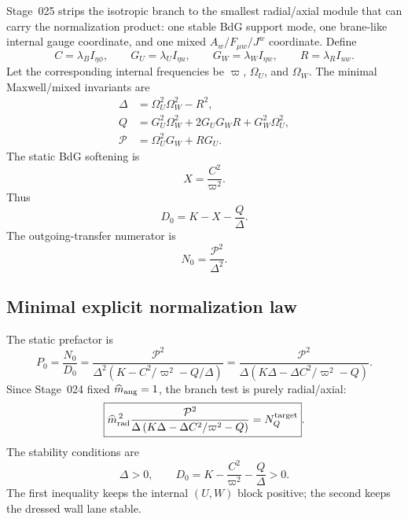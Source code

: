 Stage~025 strips the isotropic branch to the smallest radial/axial module that can carry the normalization product: one stable BdG support mode, one brane-like internal gauge coordinate, and one mixed \(A_w/F_{\mu w}/J^w\) coordinate.  Define
\begin{equation}
\label{eq:part02-stage8-couplings}
C=\lambda_B I_{\eta\phi},
\qquad
G_U=\lambda_U I_{\eta u},
\qquad
G_W=\lambda_W I_{\eta w},
\qquad
R=\lambda_R I_{uw}.
\end{equation}
Let the corresponding internal frequencies be \(\varpi\), \(\Omega_U\), and \(\Omega_W\).  The minimal Maxwell/mixed invariants are
\begin{equation}
\label{eq:part02-stage8-invariants}
\boxed{
\begin{aligned}
\Delta&=\Omega_U^2\Omega_W^2-R^2,\\
Q&=G_U^2\Omega_W^2+2G_UG_WR+G_W^2\Omega_U^2,\\
\mathcal P&=\Omega_U^2G_W+RG_U.
\end{aligned}
}
\end{equation}
The static BdG softening is
\begin{equation}
X=\frac{C^2}{\varpi^2}.
\end{equation}
Thus
\begin{equation}
\label{eq:part02-stage8-D0}
D_0=K-X-\frac{Q}{\Delta}.
\end{equation}
The outgoing-transfer numerator is
\begin{equation}
N_0=\frac{\mathcal P^2}{\Delta^2}.
\end{equation}

\subsection{Minimal explicit normalization law}
\label{subsec:part02-stage025-normalization-law}

The static prefactor is
\begin{equation}
\label{eq:part02-stage8-P0}
P_0=\frac{N_0}{D_0}
=
\frac{\mathcal P^2}{\Delta^2\left(K-C^2/\varpi^2-Q/\Delta\right)}
=
\frac{\mathcal P^2}{\Delta\left(K\Delta-\Delta C^2/\varpi^2-Q\right)}.
\end{equation}
Since Stage~024 fixed \(\widehat m_{\rm ang}=1\), the branch test is purely radial/axial:
\begin{equation}
\label{eq:part02-stage8-normalization-target}
\boxed{
\widehat m_{\rm rad}^{\,2}
\frac{\mathcal P^2}{\Delta\left(K\Delta-\Delta C^2/\varpi^2-Q\right)}
=
N_Q^{\rm target}}.
\end{equation}
The stability conditions are
\begin{equation}
\label{eq:part02-stage8-stability}
\boxed{
\Delta>0,
\qquad
D_0=K-\frac{C^2}{\varpi^2}-\frac{Q}{\Delta}>0}.
\end{equation}
The first inequality keeps the internal \((U,W)\) block positive; the second keeps the dressed wall lane stable.

